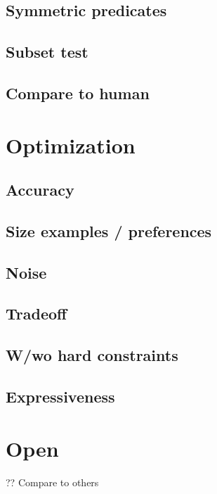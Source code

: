 \subsection{Symmetric predicates}

\subsection{Subset test}

\subsection{Compare to human}

\section{Optimization}

\subsection{Accuracy}

\subsection{Size examples / preferences}

\subsection{Noise}

\subsection{Tradeoff}

\subsection{W/wo hard constraints}

\subsection{Expressiveness}

\section{Open}
?? Compare to others